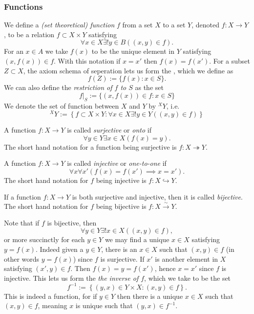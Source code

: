 \subsubsection{Functions}
\begin{definition}
    We define a \textit{(set theoretical) function} $f$ from a set $X$ to a set $Y$, denoted $f:X\rightarrow Y$, to be a relation $f\subset X\times Y$ satisfying
    $$\forall x\in X\exists! y\in B((x,y)\in f).$$
    For an $x\in A$ we take $f(x)$ to be the unique element in $Y$ satisfying $(x,f(x))\in f$. With this notation if $x=x'$ then $f(x)=f(x')$. For a subset $Z\subset X$, the axiom schema of seperation lets us form the , which we define as 
    $$f(Z) := \{ f(x) : x\in S\}.$$
    We can also define the \textit{restriction of $f$ to $S$} as the set 
    $$ \left. f\right|_S := \{ (x,f(x))\in f : x\in S\}$$
    We denote the set of function between $X$ and $Y$ by ${}^X\!Y$, i.e. 
    $${}^X\!Y := \left\{ f\subset X\times Y : \forall x\in X\exists! y \in Y((x,y)\in f)\right\} $$
\end{definition}
\begin{definition}
    A function $f : X\rightarrow Y$ is called \textit{surjective} or \textit{onto} if $$\forall y\in Y\exists x\in X (f(x)=y).$$ The short hand notation for a function being surjective is $f: X\twoheadrightarrow Y$.  
\end{definition}
\begin{definition}
    A function $f : X\rightarrow Y$ is called \textit{injective} or \textit{one-to-one} if $$\forall x\forall x'(f(x)=f(x')\implies x=x').$$
    The short hand notation for $f$ being injective is $f: X\hookrightarrow Y$.  
\end{definition}
\begin{definition}
    If a function $f: X \rightarrow Y$ is both surjective and injective, then it is called \textit{bijective}. The short hand notation for $f$ being bijective is $f: X \overset{\sim}{\rightarrow} Y$.
\end{definition}
\begin{remark}
    Note that if $f$ is bijective, then 
    $$\forall y\in Y\exists! x\in X((x,y)\in f),$$
    or more succinctly for each $y\in Y$ we may find a unique $x\in X$ satisfying $y=f(x)$. Indeed given a $y\in Y$, there is an $x\in X$ such that $(x,y)\in f$ (in other words $y=f(x)$) since $f$ is surjective. If $x'$ is another element in $X$ satisfying $(x',y)\in f$. Then $f(x)=y=f(x')$, hence $x=x'$ since $f$ is injective. This lets us form the \textit{the inverse of $f$}, which we take to be the set
    $$f^{-1}:= \left\{(y,x) \in Y\times X : (x,y) \in f \right\}.$$
    This is indeed a function, for if $y\in Y$ then there is a unique $x\in X$ such that $(x,y)\in f$, meaning $x$ is unique such that $(y,x)\in f^{-1}$. 
\end{remark}
